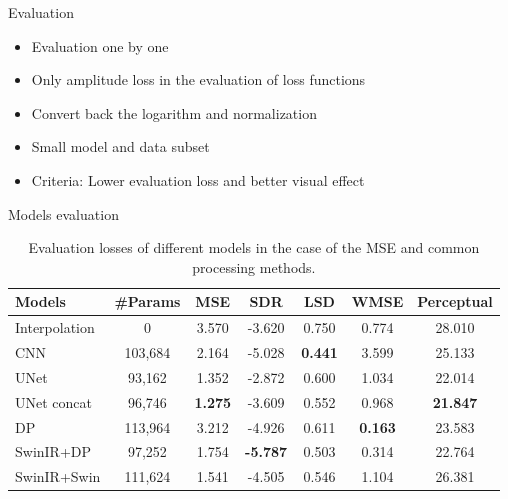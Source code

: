 \documentclass{beamer}
\begin{document}
\begin{frame}{Evaluation}
    \vspace{-1.0\baselineskip}
    \begin{itemize}
        \item Evaluation one by one
        \vspace{0.5\baselineskip}
        \item Only amplitude loss in the evaluation of loss functions
        \vspace{0.5\baselineskip}
        \item Convert back the logarithm and normalization
        \vspace{0.5\baselineskip}
        \item Small model and data subset
        \vspace{0.5\baselineskip}
        \item Criteria: Lower evaluation loss and better visual effect
    \end{itemize}
\end{frame}

\begin{frame}[t]{Models evaluation}

    \begin{table}
        \centering
        \vspace{0.5\baselineskip}
        \small
        \caption{Evaluation losses of different models in the case of the MSE and common processing methods.}
        \label{models comparison in the case of the MSE and original processing methods}
        \vspace{-0.5cm}
        \begin{tabular}{l|c|c|c|c|c|c}
            \hline
            Models & \#Params & MSE & SDR & LSD & WMSE & Perceptual \\
            \hline
            Interpolation & 0 & 3.570 & -3.620 & 0.750 & 0.774 & 28.010 \\
            \hline
            CNN & 103,684 & 2.164 & -5.028 & \textbf{0.441} & 3.599 & 25.133 \\
            \hline
            UNet & 93,162 & 1.352 & -2.872 & 0.600 & 1.034 & 22.014 \\
            \hline
            UNet concat & 96,746 & \textbf{1.275} & -3.609 & 0.552 & 0.968 & \textbf{21.847} \\
            \hline
            DP & 113,964 & 3.212 & -4.926 & 0.611 & \textbf{0.163} & 23.583 \\
            \hline
            SwinIR+DP & 97,252 & 1.754 & \textbf{-5.787} & 0.503 & 0.314 & 22.764 \\
            \hline
            SwinIR+Swin & 111,624 & 1.541 & -4.505 & 0.546 & 1.104 & 26.381 \\
            \hline
        \end{tabular}
    \end{table}
    
\end{frame}
\end{document}
